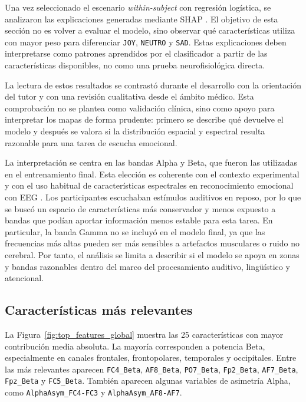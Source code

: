 Una vez seleccionado el escenario \textit{within-subject} con regresión logística, se analizaron las explicaciones generadas mediante \ac{SHAP} \cite{lundberg2017shap}. El objetivo de esta sección no es volver a evaluar el modelo, sino observar qué características utiliza con mayor peso para diferenciar \texttt{JOY}, \texttt{NEUTRO} y \texttt{SAD}. Estas explicaciones deben interpretarse como patrones aprendidos por el clasificador a partir de las características disponibles, no como una prueba neurofisiológica directa.

La lectura de estos resultados se contrastó durante el desarrollo con la orientación del tutor y con una revisión cualitativa desde el ámbito médico. Esta comprobación no se plantea como validación clínica, sino como apoyo para interpretar los mapas de forma prudente: primero se describe qué devuelve el modelo y después se valora si la distribución espacial y espectral resulta razonable para una tarea de escucha emocional.

La interpretación se centra en las bandas Alpha y Beta, que fueron las utilizadas en el entrenamiento final. Esta elección es coherente con el contexto experimental y con el uso habitual de características espectrales en reconocimiento emocional con \ac{EEG} \cite{alarcao2019eeg,koelstra2012deap}. Los participantes escuchaban estímulos auditivos en reposo, por lo que se buscó un espacio de características más conservador y menos expuesto a bandas que podían aportar información menos estable para esta tarea. En particular, la banda Gamma no se incluyó en el modelo final, ya que las frecuencias más altas pueden ser más sensibles a artefactos musculares o ruido no cerebral. Por tanto, el análisis se limita a describir si el modelo se apoya en zonas y bandas razonables dentro del marco del procesamiento auditivo, lingüístico y atencional.

\subsection{Características más relevantes}

La Figura~\ref{fig:top_features_global} muestra las 25 características con mayor contribución media absoluta. La mayoría corresponden a potencia Beta, especialmente en canales frontales, frontopolares, temporales y occipitales. Entre las más relevantes aparecen \texttt{FC4\_Beta}, \texttt{AF8\_Beta}, \texttt{PO7\_Beta}, \texttt{Fp2\_Beta}, \texttt{AF7\_Beta}, \texttt{Fpz\_Beta} y \texttt{FC5\_Beta}. También aparecen algunas variables de asimetría Alpha, como \texttt{AlphaAsym\_FC4-FC3} y \texttt{AlphaAsym\_AF8-AF7}.

